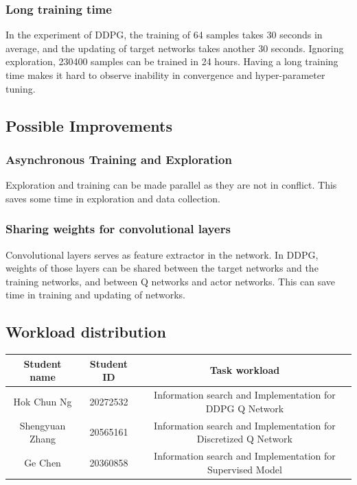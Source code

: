 \documentclass[a4paper]{article}
\begin{document}
\subsubsection{Long training time}

In the experiment of DDPG, the training of 64 samples takes 30 seconds in average, and the updating of target networks takes another 30 seconds. Ignoring exploration, 230400 samples can be trained in 24 hours. Having a long training time makes it hard to observe inability in convergence and hyper-parameter tuning.

\subsection{Possible Improvements}

\subsubsection{Asynchronous Training and Exploration}

Exploration and training can be made parallel as they are not in conflict. This saves some time in exploration and data collection.

\subsubsection{Sharing weights for convolutional layers}

Convolutional layers serves as feature extractor in the network. In DDPG, weights of those layers can be shared between the target networks and the training networks, and between Q networks and actor networks. This can save time in training and updating of networks.


\subsection{Workload distribution}
\begin{table}[htbp]
\centering
\begin{tabular}{|c|c|c|}
\hline
Student name & Student ID & Task workload   \\ \hline
Hok Chun Ng & 20272532 & Information search and Implementation for DDPG Q Network \\
Shengyuan Zhang & 20565161 & Information search and Implementation for Discretized Q Network   \\
Ge Chen & 20360858 & Information search and Implementation for Supervised Model \\ \hline
\end{tabular}
\label{table:task_allocation}
\end{table}


{}

\end{document}
